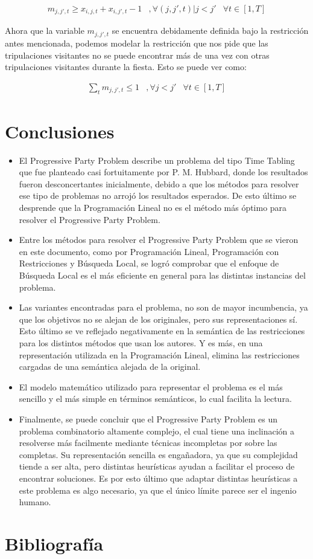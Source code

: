\documentclass[letter, 10pt]{article}
\begin{document}
\begin{eqnarray}
m_{j,j',t} \geq x_{i,j,t} + x_{i,j',t} - 1 & , \forall(j,j',t)|j<j'& \forall t \in [1,T]
\end{eqnarray}

Ahora que la variable $m_{j,j',t}$ se encuentra debidamente definida bajo la restricción antes mencionada, podemos modelar la restricción que nos pide que las tripulaciones visitantes no se puede encontrar más de una vez con otras tripulaciones visitantes durante la fiesta. Esto se puede ver como:

\begin{eqnarray}
\sum_t m_{j,j',t} \leq 1 & , \forall j<j'& \forall t \in [1,T]
\end{eqnarray}

\section{Conclusiones}
\begin{itemize}
\item El Progressive Party Problem describe un problema del tipo Time Tabling que fue planteado casi fortuitamente por P. M. Hubbard, donde los resultados fueron desconcertantes inicialmente, debido a que los métodos para resolver ese tipo de problemas no arrojó los resultados esperados. De esto último se desprende que la Programación Lineal no es el método más óptimo para resolver el Progressive Party Problem.

\item Entre los métodos para resolver el Progressive Party Problem que se vieron en este documento, como por Programación Lineal, Programación con Restricciones y Búsqueda Local, se logró comprobar que el enfoque de Búsqueda Local es el más eficiente en general para las distintas instancias del problema.

\item Las variantes encontradas para el problema, no son de mayor incumbencia, ya que los objetivos no se alejan de los originales, pero sus representaciones sí. Esto último se ve reflejado negativamente en la semántica de las restricciones para los distintos métodos que usan los autores. Y es más, en una representación utilizada en la Programación Lineal, elimina las restricciones cargadas de una semántica alejada de la original.

\item El modelo matemático utilizado para representar el problema es el más sencillo y el más simple en términos semánticos, lo cual facilita la lectura.

\item Finalmente, se puede concluir que el Progressive Party Problem es un problema combinatorio altamente complejo, el cual tiene una inclinación a resolverse más facilmente mediante técnicas incompletas por sobre las completas. Su representación sencilla es engañadora, ya que su complejidad tiende a ser alta, pero distintas heurísticas ayudan a facilitar el proceso de encontrar soluciones. Es por esto último que adaptar distintas heurísticas a este problema es algo necesario, ya que el único límite parece ser el ingenio humano.
\end{itemize}

\section{Bibliografía}


\end{document}
